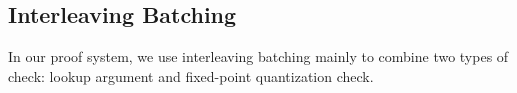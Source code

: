 

\subsection{Interleaving Batching}

In our proof system, we use interleaving batching mainly to combine
  two types of check:
  lookup argument and fixed-point quantization check.

